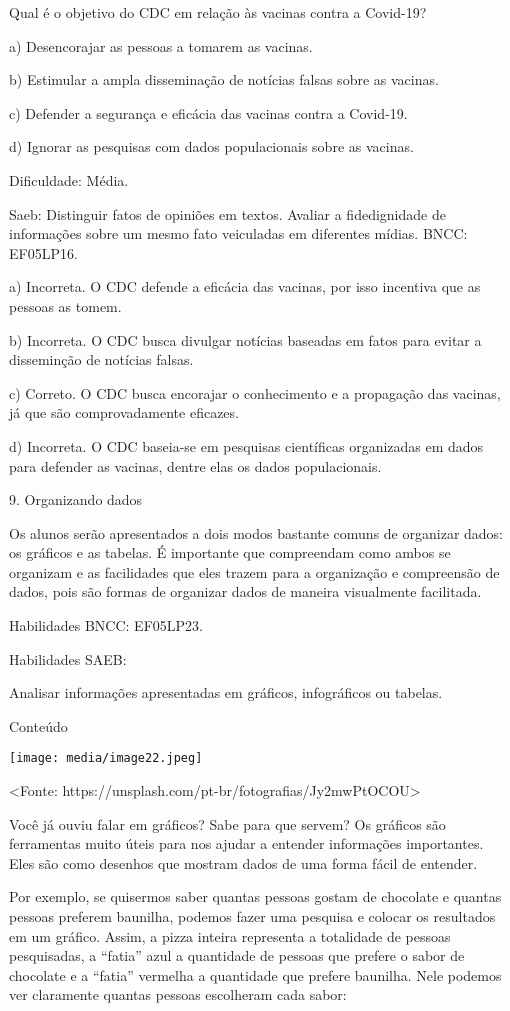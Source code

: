 Qual é o objetivo do CDC em relação às vacinas contra a Covid-19?

a) Desencorajar as pessoas a tomarem as vacinas.

b) Estimular a ampla disseminação de notícias falsas sobre as vacinas.

c) Defender a segurança e eficácia das vacinas contra a Covid-19.

d) Ignorar as pesquisas com dados populacionais sobre as vacinas.

Dificuldade: Média.

Saeb: Distinguir fatos de opiniões em textos. Avaliar a fidedignidade de
informações sobre um mesmo fato veiculadas em diferentes mídias. BNCC:
EF05LP16.

a) Incorreta. O CDC defende a eficácia das vacinas, por isso incentiva
que as pessoas as tomem.

b) Incorreta. O CDC busca divulgar notícias baseadas em fatos para
evitar a disseminção de notícias falsas.

c) Correto. O CDC busca encorajar o conhecimento e a propagação das
vacinas, já que são comprovadamente eficazes.

d) Incorreta. O CDC baseia-se em pesquisas científicas organizadas em
dados para defender as vacinas, dentre elas os dados populacionais.

9. Organizando dados

Os alunos serão apresentados a dois modos bastante comuns de organizar
dados: os gráficos e as tabelas. É importante que compreendam como ambos
se organizam e as facilidades que eles trazem para a organização e
compreensão de dados, pois são formas de organizar dados de maneira
visualmente facilitada.

Habilidades BNCC: EF05LP23.

Habilidades SAEB:

Analisar informações apresentadas em gráficos, infográficos ou tabelas.

Conteúdo

\texttt{[image: media/image22.jpeg]}

\textless{}Fonte:
https://unsplash.com/pt-br/fotografias/Jy2mwPtOCOU\textgreater{}

Você já ouviu falar em gráficos? Sabe para que servem? Os gráficos são
ferramentas muito úteis para nos ajudar a entender informações
importantes. Eles são como desenhos que mostram dados de uma forma fácil
de entender.

Por exemplo, se quisermos saber quantas pessoas gostam de chocolate e
quantas pessoas preferem baunilha, podemos fazer uma pesquisa e colocar
os resultados em um gráfico. Assim, a pizza inteira representa a
totalidade de pessoas pesquisadas, a ``fatia'' azul a quantidade de
pessoas que prefere o sabor de chocolate e a ``fatia'' vermelha a
quantidade que prefere baunilha. Nele podemos ver claramente quantas
pessoas escolheram cada sabor:

